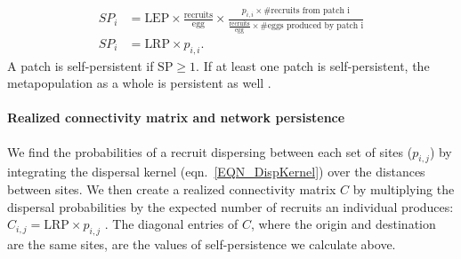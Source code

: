 \documentclass[12pt, oneside]{article}   	%
\begin{document}
\begin{equation}
\begin{split}
SP_i &= \text{LEP} \times \frac{\text{recruits}}{\text{egg}} \times \frac{p_{i,i} \times \text{\# recruits from patch i}}{\frac{\text{recruits}}{\text{egg}} \times \text{\# eggs produced by patch i}} \\ 
SP_i &= \text{LRP} \times p_{i,i}. \label{EQN_SP}  %
\end{split}
\end{equation}
A patch is self-persistent if $\text{SP} \geq 1$. If at least one patch is self-persistent, the metapopulation as a whole is persistent as well \citep{hastings_persistence_2006, burgess2014beyond}.

\paragraph*{Realized connectivity matrix and network persistence}
We find the probabilities of a recruit dispersing between each set of sites ($p_{i,j}$) by integrating the dispersal kernel (eqn.\ \ref{EQN_DispKernel}) over the distances between sites. We then create a realized connectivity matrix $C$ by multiplying the dispersal probabilities by the expected number of recruits an individual produces: $C_{i,j} = \text{LRP} \times p_{i,j}$ \citep[][though we include egg-recruit survival in LRP, rather than in $p_{i,j}$ as they do]{burgess2014beyond}. The diagonal entries of $C$, where the origin and destination are the same sites, are the values of self-persistence we calculate above. 
\end{document}
